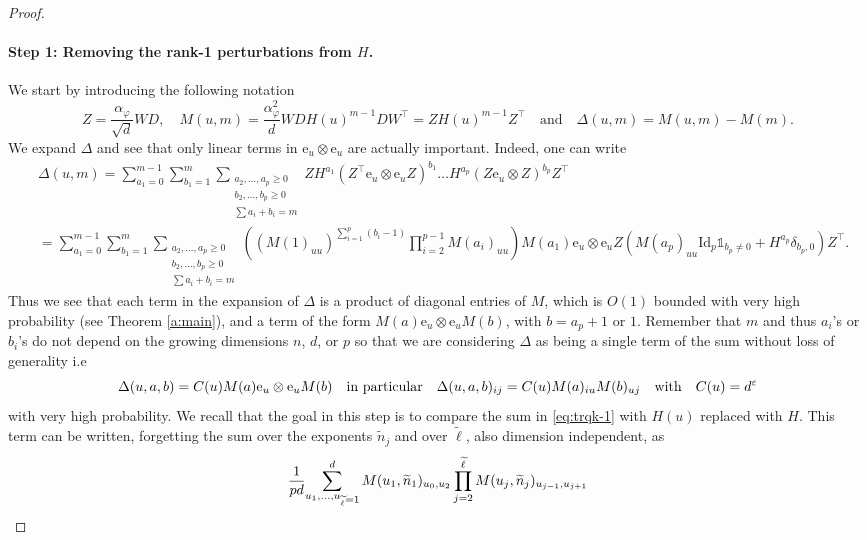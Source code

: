 \documentclass[letterpaper, 10pt, dvipsnames]{article}
\numberwithin{equation}{section}
\newcommand{\e}{\mathrm{e}}
\renewcommand{\phi}{\varphi}
\renewcommand{\tilde}{\widetilde}
\let\O\relax
\newcommand{\O}[1]{\mathcal{O}\left(#1\right)}
\theoremstyle{definition}
\begin{document}
\begin{proof}
  \paragraph{Step 1: Removing the rank-1 perturbations from $H$.} We start by introducing the following notation
  \[
  Z = \frac{\alpha_\phi}{\sqrt{d}}WD,\quad
    M(u,m) = \frac{\alpha_\phi^2}{d}WDH(u)^{m-1}DW^\top = ZH(u)^{m-1}Z^\top 
  \quad\text{and}\quad
  \Delta(u,m) = M(u,m)-M(m).
  \]
  We expand $\Delta$ and see that only linear terms in $\e_u\otimes \e_u$ are actually important. Indeed, one can write 
  \begin{align*}
  &\Delta(u,m) = 
  \sum_{a_1=0}^{m-1}\sum_{b_1=1}^m\sum_{\substack{a_2,\dots,a_p\geqslant 0\\b_2,\dots,b_p\geqslant 0\\\sum a_i+b_i=m}}
  ZH^{a_1}(Z^\top \e_u\otimes \e_uZ)^{b_1}\dots H^{a_p}(Z\e_u\otimes Z)^{b_p}Z^\top\\
  &=
  \sum_{a_1=0}^{m-1}\sum_{b_1=1}^m\sum_{\substack{a_2,\dots,a_p\geqslant 0\\b_2,\dots,b_p\geqslant 0\\\sum a_i+b_i=m}}
  \left(
    \left(
      M(1)_{uu}
    \right)^{\sum_{i=1}^p(b_i-1)}
    \prod_{i=2}^{p-1}M(a_i)_{uu}
  \right)
  M(a_1)\e_u\otimes \e_u Z
  \left(
    M(a_p)_{uu}\mathrm{Id}_p\mathds{1}_{b_p\neq 0}+H^{a_p}\delta_{b_p,0}
  \right) Z^\top.
  \end{align*}
  Thus we see that each term in the expansion of $\Delta$ is a product of diagonal entries of $M$, which is $O(1)$ bounded with very high probability (see Theorem \ref{a:main}), and a term of the form $M(a)\e_u\otimes \e_uM(b)$, with $b=a_p+1$ or $1$. Remember that $m$ and thus $a_i$'s or $b_i$'s do not depend on the growing dimensions $n$, $d$, or $p$ so that we are considering $\Delta$ as being a single term of the sum without loss of generality i.e 
  \[
  \Delta(u,a,b) = C(u)M(a)\e_u\otimes \e_u M(b)\quad\text{in particular}\quad 
  \Delta(u,a,b)_{ij} = C(u)M(a)_{iu}M(b)_{uj}
  \quad\text{with}\quad 
  C(u)=\O{d^\varepsilon}
  \]  
  with very high probability.
  We recall that the goal in this step is to compare the sum in \eqref{eq:trqk-1} with $H(u)$ replaced with $H$. This term can be written, forgetting the sum over the exponents $\tilde{n}_j$ and over $\tilde{\ell}$, also dimension independent, as 
  \[
    \frac{1}{pd}
    \hspace{-.2em}\sum_{\substack{u_1, \dots, u_{\tilde{\ell}}}=1}^d
    M(u_1,\tilde{n}_1)_{u_0,u_2}
    \prod_{j=2}^{\tilde{\ell}}
    M(u_j,\tilde{n}_j)_{u_{j-1},u_{j+1}}
\]
\end{proof}
\end{document}

